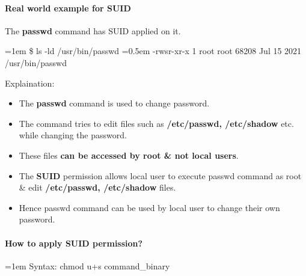 \begin{flushleft}
	\paragraph{Real world example for SUID}
	The \textbf{passwd} command has SUID applied on it.
	\bigskip
	\begin{tcolorbox}[breakable,notitle,boxrule=-0pt,colback=black,colframe=black]
		\color{green}
		\font=1em
		\$ ls -ld /usr/bin/passwd
		\color{white}
		\newline
		\font=0.5em
		-rwsr-xr-x 1 root root 68208 Jul 15  2021 /usr/bin/passwd
		\font=4pt
	\end{tcolorbox}
	Explaination:
	\begin{itemize}
		\item The \textbf{passwd} command is used to change password.
		\item The command tries to edit files such as \textbf{/etc/passwd, /etc/shadow} etc. while changing the password.
		\item These files \textbf{can be accessed by root \& not local users}.
		\item The \textbf{SUID} permission allows local user to execute passwd command as root \& edit \textbf{/etc/passwd, /etc/shadow} files.
		\item Hence passwd command can be used by local user to change their own password.
	\end{itemize}
	
	\newpage
	
	\paragraph{How to apply SUID permission?}
	\begin{tcolorbox}[breakable,notitle,boxrule=0pt,colback=pink,colframe=pink]
		\color{black}
		\font=1em
		Syntax: chmod u+s command\_binary
		\font=4pt
	\end{tcolorbox}
	

\end{flushleft}
